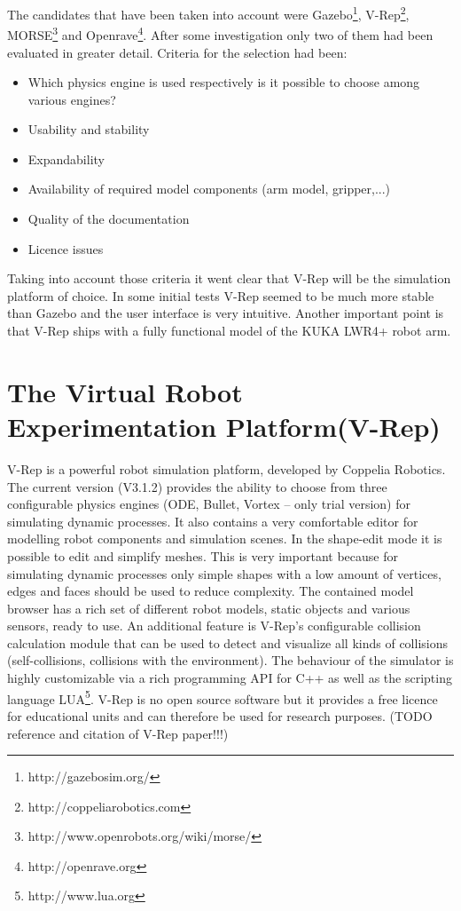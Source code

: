 The candidates that have been taken into account were Gazebo\footnote{http://gazebosim.org/}, V-Rep\footnote{http://coppeliarobotics.com}, MORSE\footnote{http://www.openrobots.org/wiki/morse/} and Openrave\footnote{http://openrave.org}. After some investigation only two of them had been evaluated in greater detail. Criteria for the selection had been:

\begin{itemize}
\item
Which physics engine is used respectively is it possible to choose among various engines?
\item
Usability and stability
\item
Expandability
\item
Availability of required model components (arm model, gripper,...)
\item
Quality of the documentation
\item
Licence issues
\end{itemize}

Taking into account those criteria it went clear that V-Rep will be the simulation platform of choice. In some initial tests V-Rep seemed to be much more stable than Gazebo and the user interface is very intuitive. Another important point is that V-Rep ships with a fully functional model of the KUKA LWR4+ robot arm.

\section{The Virtual Robot Experimentation Platform(V-Rep)}
V-Rep is a powerful robot simulation platform, developed by Coppelia Robotics. The current version (V3.1.2) provides the ability to choose from three configurable physics engines (ODE, Bullet, Vortex -- only trial version) for simulating dynamic processes. It also contains a very comfortable editor for modelling robot components and simulation scenes. In the shape-edit mode it is possible to edit and simplify meshes. This is very important because for simulating dynamic processes only simple shapes with a low amount of vertices, edges and faces should be used to reduce complexity. The contained model browser has a rich set of different robot models, static objects and various sensors, ready to use. An additional feature is V-Rep's configurable collision calculation module that can be used to detect and visualize all kinds of collisions (self-collisions, collisions with the environment). The behaviour of the simulator is highly customizable via a rich programming API for C++ as well as the scripting language LUA\footnote{http://www.lua.org}. V-Rep is no open source software but it provides a free licence for educational units and can therefore be used for research purposes. (TODO reference and citation of V-Rep paper!!!)

